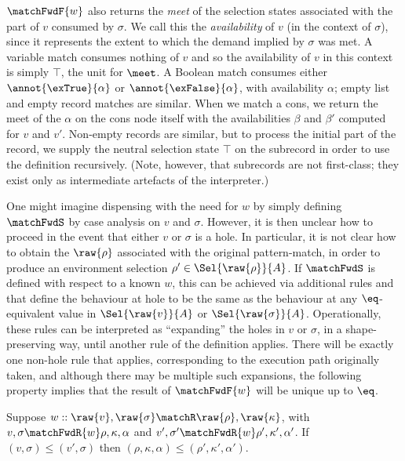 $\matchFwdF{w}$ also returns the \emph{meet} of the selection states associated with the part of $v$ consumed by $\sigma$. We call this the \emph{availability} of $v$ (in the context of $\sigma$), since it represents the extent to which the demand implied by $\sigma$ was met. A variable match consumes nothing of $v$ and so the availability of $v$ in this context is simply $\top$, the unit for $\meet$. A Boolean match consumes either $\annot{\exTrue}{\alpha}$ or $\annot{\exFalse}{\alpha}$, with availability $\alpha$; empty list and empty record matches are similar. When we match a cons, we return the meet of the $\alpha$ on the cons node itself with the availabilities $\beta$ and $\beta'$ computed for $v$ and $v'$. Non-empty records are similar, but to process the initial part of the record, we supply the neutral selection state $\top$ on the subrecord in order to use the definition recursively. (Note, however, that subrecords are not first-class; they exist only as intermediate artefacts of the interpreter.)

One might imagine dispensing with the need for $w$ by simply defining $\matchFwdS$ by case analysis on $v$ and $\sigma$. However, it is then unclear how to proceed in the event that either $v$ or $\sigma$ is a hole. In particular, it is not clear how to obtain the $\raw{\rho}$ associated with the original pattern-match, in order to produce an environment selection $\rho' \in \Sel{\raw{\rho}}{A}$. If $\matchFwdS$ is defined with respect to a known $w$, this can be achieved via additional rules  and  that define the behaviour at hole to be the same as the behaviour at any $\eq$-equivalent value in $\Sel{\raw{v}}{A}$ or $\Sel{\raw{\sigma}}{A}$. Operationally, these rules can be interpreted as ``expanding'' the holes in $v$ or $\sigma$, in a shape-preserving way, until another rule of the definition applies. There will be exactly one non-hole rule that applies, corresponding to the execution path originally taken, and although there may be multiple such expansions, the following property implies that the result of $\matchFwdF{w}$ will be unique up to $\eq$.

\begin{lemma}
   Suppose $w :: \raw{v}, \raw{\sigma} \matchR \raw{\rho}, \raw{\kappa}$, with $v, \sigma \matchFwdR{w} \rho, \kappa, \alpha$ and $v', \sigma' \matchFwdR{w} \rho', \kappa', \alpha'$. If $(v, \sigma) \leq (v', \sigma)$ then $(\rho, \kappa, \alpha) \leq (\rho', \kappa', \alpha')$.
\end{lemma}

